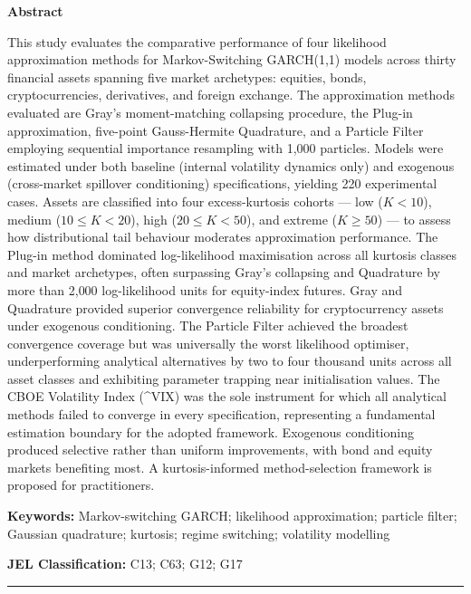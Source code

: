 \documentclass[12pt, a4paper]{article}
\begin{document}
\begin{mdframed}
\singlespacing\small
\noindent\textbf{Abstract}

\noindent
This study evaluates the comparative performance of four likelihood approximation methods for Markov-Switching GARCH(1,1) models across thirty financial assets spanning five market archetypes: equities, bonds, cryptocurrencies, derivatives, and foreign exchange. The approximation methods evaluated are Gray's moment-matching collapsing procedure, the Plug-in approximation, five-point Gauss-Hermite Quadrature, and a Particle Filter employing sequential importance resampling with 1,000 particles. Models were estimated under both baseline (internal volatility dynamics only) and exogenous (cross-market spillover conditioning) specifications, yielding 220 experimental cases. Assets are classified into four excess-kurtosis cohorts — low ($K < 10$), medium ($10 \le K < 20$), high ($20 \le K < 50$), and extreme ($K \ge 50$) — to assess how distributional tail behaviour moderates approximation performance. The Plug-in method dominated log-likelihood maximisation across all kurtosis classes and market archetypes, often surpassing Gray's collapsing and Quadrature by more than 2{,}000 log-likelihood units for equity-index futures. Gray and Quadrature provided superior convergence reliability for cryptocurrency assets under exogenous conditioning. The Particle Filter achieved the broadest convergence coverage but was universally the worst likelihood optimiser, underperforming analytical alternatives by two to four thousand units across all asset classes and exhibiting parameter trapping near initialisation values. The CBOE Volatility Index (\^{}VIX) was the sole instrument for which all analytical methods failed to converge in every specification, representing a fundamental estimation boundary for the adopted framework. Exogenous conditioning produced selective rather than uniform improvements, with bond and equity markets benefiting most. A kurtosis-informed method-selection framework is proposed for practitioners.

\vspace{0.5em}
\noindent\textbf{Keywords:} Markov-switching GARCH; likelihood approximation; particle filter; Gaussian quadrature; kurtosis; regime switching; volatility modelling

\noindent\textbf{JEL Classification:} C13; C63; G12; G17
\end{mdframed}
\vspace{1em}
\hrule
\vspace{1.5em}
\end{document}
